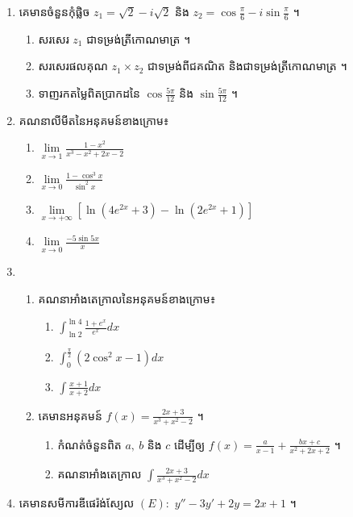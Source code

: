 \documentclass[a4paper, 11pt]{exam}
\begin{document}
\begin{enumerate}[I]
	\item គេមានចំនួនកុំផ្លិច $z_1=\sqrt{2}-i\sqrt{2}$ និង $z_2=\cos\frac{\pi}{6}-i\sin\frac{\pi}{6}$ ។
	\begin{enumerate}[a]
		\item សរសេរ $z_1$ ជាទម្រង់ត្រីកោណមាត្រ ។
		\item សរសេរផលគុណ $z_1\times z_2$ ជាទម្រង់ពីជគណិត និងជាទម្រង់ត្រីកោណមាត្រ ។
		\item ទាញរកតម្លៃពិតប្រាកដនៃ $\cos\frac{5\pi}{12}$ និង $\sin\frac{5\pi}{12}$ ។
	\end{enumerate}
	\item គណនាលីមីតនៃអនុគមន៍ខាងក្រោម៖
	\begin{multicols}{2}
		\begin{enumerate}[a]
			\item $\lim\limits_{x\to1} \frac{1-x^2}{x^3-x^2+2x-2}$
			\item $\lim\limits_{x\to 0} \frac{1-\cos^3x}{\sin^2x}$
			\item $\lim\limits_{x\to+\infty} [\ln(4e^{2x}+3)-\ln(2e^{2x}+1)]$
			\item $\lim\limits_{x\to0} \frac{-5\sin5x}{x}$
		\end{enumerate}
	\end{multicols}
	\item \begin{enumerate}[1]
		\item គណនាអាំងតេក្រាលនៃអនុគមន៍ខាងក្រោម៖
		\begin{multicols}{3}
			\begin{enumerate}[a]
				\item $\int_{\ln2}^{\ln4}\frac{1+e^x}{e^x}dx$
				\item $\int_{0}^{\frac{\pi}{2}} (2\cos^2x-1)dx$
				\item $\int \frac{x+1}{x+2}dx$
			\end{enumerate}
		\end{multicols}
		\item គេមានអនុគមន៍ $f(x)=\frac{2x+3}{x^3+x^2-2}$ ។
		\begin{enumerate}[a]
			\item កំណត់ចំនួនពិត $a, ~b$ និង $c$ ដើម្បីឲ្យ $f(x)=\frac{a}{x-1}+\frac{bx+c}{x^2+2x+2}$ ។
			\item គណនាអាំងតេក្រាល $\int \frac{2x+3}{x^3+x^2-2} dx$ 
		\end{enumerate}
	\end{enumerate}
	\item គេមានសមីការឌីផេរ៉ង់ស្យែល $(E):$ $y''-3y'+2y = 2x+1$ ។

\end{enumerate}
\end{document}
